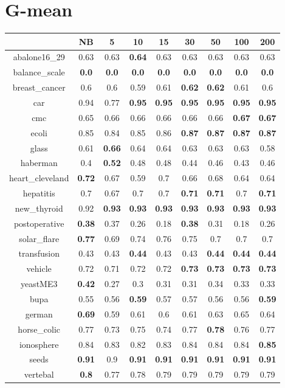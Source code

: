 \documentclass{article}%
\begin{document}
%
\section*{G{-}mean}%
\begin{tabular}{c|cccccccc}%
\hline%
&NB&5&10&15&30&50&100&200\\%
\hline%
abalone16\_29&0.63&0.63&\textbf{0.64}&0.63&0.63&0.63&0.63&0.63\\%
\hline%
balance\_scale&\textbf{0.0}&\textbf{0.0}&\textbf{0.0}&\textbf{0.0}&\textbf{0.0}&\textbf{0.0}&\textbf{0.0}&\textbf{0.0}\\%
\hline%
breast\_cancer&0.6&0.6&0.59&0.61&\textbf{0.62}&\textbf{0.62}&0.61&0.6\\%
\hline%
car&0.94&0.77&\textbf{0.95}&\textbf{0.95}&\textbf{0.95}&\textbf{0.95}&\textbf{0.95}&\textbf{0.95}\\%
\hline%
cmc&0.65&0.66&0.66&0.66&0.66&0.66&\textbf{0.67}&\textbf{0.67}\\%
\hline%
ecoli&0.85&0.84&0.85&0.86&\textbf{0.87}&\textbf{0.87}&\textbf{0.87}&\textbf{0.87}\\%
\hline%
glass&0.61&\textbf{0.66}&0.64&0.64&0.63&0.63&0.63&0.58\\%
\hline%
haberman&0.4&\textbf{0.52}&0.48&0.48&0.44&0.46&0.43&0.46\\%
\hline%
heart\_cleveland&\textbf{0.72}&0.67&0.59&0.7&0.66&0.68&0.64&0.64\\%
\hline%
hepatitis&0.7&0.67&0.7&0.7&\textbf{0.71}&\textbf{0.71}&0.7&\textbf{0.71}\\%
\hline%
new\_thyroid&0.92&\textbf{0.93}&\textbf{0.93}&\textbf{0.93}&\textbf{0.93}&\textbf{0.93}&\textbf{0.93}&\textbf{0.93}\\%
\hline%
postoperative&\textbf{0.38}&0.37&0.26&0.18&\textbf{0.38}&0.31&0.18&0.26\\%
\hline%
solar\_flare&\textbf{0.77}&0.69&0.74&0.76&0.75&0.7&0.7&0.7\\%
\hline%
transfusion&0.43&0.43&\textbf{0.44}&0.43&0.43&\textbf{0.44}&\textbf{0.44}&\textbf{0.44}\\%
\hline%
vehicle&0.72&0.71&0.72&0.72&\textbf{0.73}&\textbf{0.73}&\textbf{0.73}&\textbf{0.73}\\%
\hline%
yeastME3&\textbf{0.42}&0.27&0.3&0.31&0.31&0.34&0.33&0.33\\%
\hline%
bupa&0.55&0.56&\textbf{0.59}&0.57&0.57&0.56&0.56&\textbf{0.59}\\%
\hline%
german&\textbf{0.69}&0.59&0.61&0.6&0.61&0.63&0.65&0.64\\%
\hline%
horse\_colic&0.77&0.73&0.75&0.74&0.77&\textbf{0.78}&0.76&0.77\\%
\hline%
ionosphere&0.84&0.83&0.82&0.83&0.84&0.84&0.84&\textbf{0.85}\\%
\hline%
seeds&\textbf{0.91}&0.9&\textbf{0.91}&\textbf{0.91}&\textbf{0.91}&\textbf{0.91}&\textbf{0.91}&\textbf{0.91}\\%
\hline%
vertebal&\textbf{0.8}&0.77&0.78&0.79&0.79&0.79&0.79&0.79\\%
\hline%
\end{tabular}

%
\end{document}
